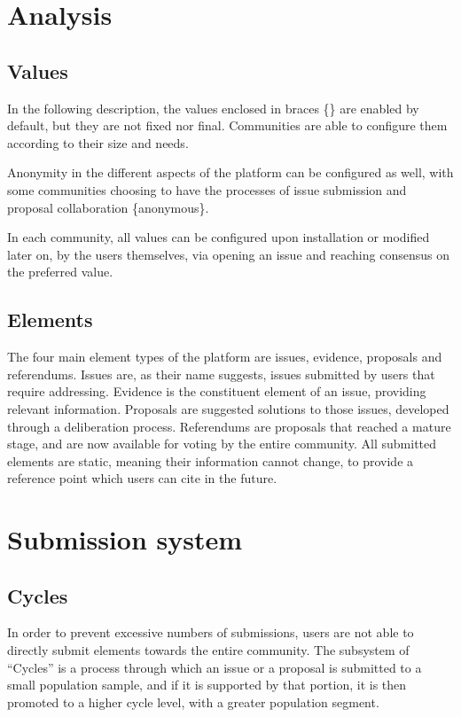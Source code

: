 \documentclass[a4paper,11pt]{article}
\begin{document}
\begin{multicols}{2}
\section{Analysis} \label{analysis}

\subsection{Values} \label{values}

In the following description, the values enclosed in braces \{\} are enabled by default, but they are not fixed nor final. Communities are able to configure them according to their size and needs.

Anonymity in the different aspects of the platform can be configured as well, with some communities choosing to have the processes of issue submission and proposal collaboration \{anonymous\}.

In each community, all values can be configured upon installation or modified later on, by the users themselves, via opening an issue and reaching consensus on the preferred value.

\subsection{Elements} \label{elements}

The four main element types of the platform are issues, evidence, proposals and referendums. Issues are, as their name suggests, issues submitted by users that require addressing. Evidence is the constituent element of an issue, providing relevant information. Proposals are suggested solutions to those issues, developed through a deliberation process. Referendums are proposals that reached a mature stage, and are now available for voting by the entire community. All submitted elements are static, meaning their information cannot change, to provide a reference point which users can cite in the future.

\section{Submission system} \label{submissionsystem}

\subsection{Cycles} \label{cycles}

In order to prevent excessive numbers of submissions, users are not able to directly submit elements towards the entire community. The subsystem of “Cycles” is a process through which an issue or a proposal is submitted to a small population sample, and if it is supported by that portion, it is then promoted to a higher cycle level, with a greater population segment.


\end{multicols}
\end{document}
